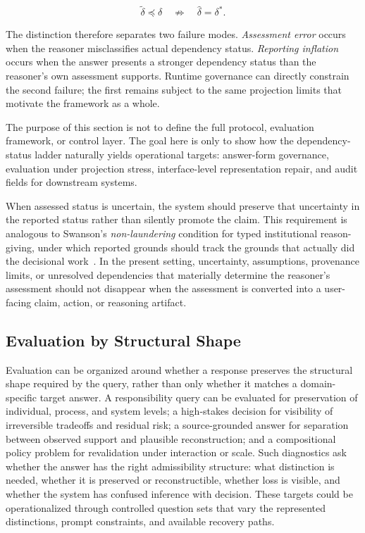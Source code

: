 \documentclass[11pt]{article}
\begin{document}
\[
\widetilde{\delta}
\preceq
\widehat{\delta}
\quad\not\Rightarrow\quad
\widehat{\delta}=\delta^{*}.
\]

The distinction therefore separates two failure modes. \emph{Assessment error} occurs when the reasoner misclassifies actual dependency status. \emph{Reporting inflation} occurs when the answer presents a stronger dependency status than the reasoner's own assessment supports. Runtime governance can directly constrain the second failure; the first remains subject to the same projection limits that motivate the framework as a whole.

The purpose of this section is not to define the full protocol, evaluation framework, or control layer. The goal here is only to show how the dependency-status ladder naturally yields operational targets: answer-form governance, evaluation under projection stress, interface-level representation repair, and audit fields for downstream systems.

When assessed status is uncertain, the system should preserve that uncertainty in the reported status rather than silently promote the claim. This requirement is analogous to Swanson's \emph{non-laundering} condition for typed institutional reason-giving, under which reported grounds should track the grounds that actually did the decisional work~\cite{Swanson2026Typed}. In the present setting, uncertainty, assumptions, provenance limits, or unresolved dependencies that materially determine the reasoner's assessment should not disappear when the assessment is converted into a user-facing claim, action, or reasoning artifact.

\subsection{Evaluation by Structural Shape}

Evaluation can be organized around whether a response preserves the structural shape required by the query, rather than only whether it matches a domain-specific target answer. A responsibility query can be evaluated for preservation of individual, process, and system levels; a high-stakes decision for visibility of irreversible tradeoffs and residual risk; a source-grounded answer for separation between observed support and plausible reconstruction; and a compositional policy problem for revalidation under interaction or scale. Such diagnostics ask whether the answer has the right admissibility structure: what distinction is needed, whether it is preserved or reconstructible, whether loss is visible, and whether the system has confused inference with decision. These targets could be operationalized through controlled question sets that vary the represented distinctions, prompt constraints, and available recovery paths.
\end{document}
